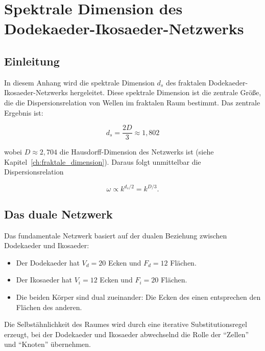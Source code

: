 
\chapter{Spektrale Dimension des Dodekaeder-Ikosaeder-Netzwerks}
\label{app:spektrale_dimension}

\section{Einleitung}
\label{app:spektrale_einleitung}

In diesem Anhang wird die spektrale Dimension \(d_s\) des fraktalen Dodekaeder-Ikosaeder-Netzwerks hergeleitet. Diese spektrale Dimension ist die zentrale Größe, die die Dispersionsrelation von Wellen im fraktalen Raum bestimmt. Das zentrale Ergebnis ist:

\[
d_s = \frac{2D}{3} \approx 1,802
\]

wobei \(D \approx 2,704\) die Hausdorff-Dimension des Netzwerks ist (siehe Kapitel~\ref{ch:fraktale_dimension}). Daraus folgt unmittelbar die Dispersionsrelation

\[
\omega \propto k^{d_s/2} = k^{D/3}.
\]

\section{Das duale Netzwerk}
\label{app:spektrale_dual}

Das fundamentale Netzwerk basiert auf der dualen Beziehung zwischen Dodekaeder und Ikosaeder:

\begin{itemize}
    \item Der Dodekaeder hat \(V_d = 20\) Ecken und \(F_d = 12\) Flächen.
    \item Der Ikosaeder hat \(V_i = 12\) Ecken und \(F_i = 20\) Flächen.
    \item Die beiden Körper sind dual zueinander: Die Ecken des einen entsprechen den Flächen des anderen.
\end{itemize}

Die Selbstähnlichkeit des Raumes wird durch eine iterative Substitutionsregel erzeugt, bei der Dodekaeder und Ikosaeder abwechselnd die Rolle der \enquote{Zellen} und \enquote{Knoten} übernehmen.

